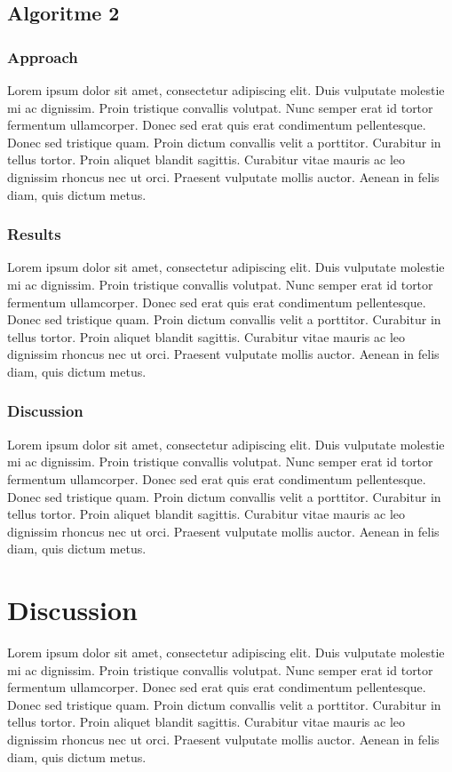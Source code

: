 \documentclass[11pt]{article}
\begin{document}
\subsection{Algoritme 2}
\subsubsection{Approach}
Lorem ipsum dolor sit amet, consectetur adipiscing elit. Duis vulputate molestie mi ac dignissim. Proin tristique convallis volutpat. Nunc semper erat id tortor fermentum ullamcorper. Donec sed erat quis erat condimentum pellentesque. Donec sed tristique quam. Proin dictum convallis velit a porttitor. Curabitur in tellus tortor. Proin aliquet blandit sagittis. Curabitur vitae mauris ac leo dignissim rhoncus nec ut orci. Praesent vulputate mollis auctor. Aenean in felis diam, quis dictum metus.

\subsubsection{Results}

Lorem ipsum dolor sit amet, consectetur adipiscing elit. Duis vulputate molestie mi ac dignissim. Proin tristique convallis volutpat. Nunc semper erat id tortor fermentum ullamcorper. Donec sed erat quis erat condimentum pellentesque. Donec sed tristique quam. Proin dictum convallis velit a porttitor. Curabitur in tellus tortor. Proin aliquet blandit sagittis. Curabitur vitae mauris ac leo dignissim rhoncus nec ut orci. Praesent vulputate mollis auctor. Aenean in felis diam, quis dictum metus.

\subsubsection{Discussion}
Lorem ipsum dolor sit amet, consectetur adipiscing elit. Duis vulputate molestie mi ac dignissim. Proin tristique convallis volutpat. Nunc semper erat id tortor fermentum ullamcorper. Donec sed erat quis erat condimentum pellentesque. Donec sed tristique quam. Proin dictum convallis velit a porttitor. Curabitur in tellus tortor. Proin aliquet blandit sagittis. Curabitur vitae mauris ac leo dignissim rhoncus nec ut orci. Praesent vulputate mollis auctor. Aenean in felis diam, quis dictum metus.



\section{Discussion}
Lorem ipsum dolor sit amet, consectetur adipiscing elit. Duis vulputate molestie mi ac dignissim. Proin tristique convallis volutpat. Nunc semper erat id tortor fermentum ullamcorper. Donec sed erat quis erat condimentum pellentesque. Donec sed tristique quam. Proin dictum convallis velit a porttitor. Curabitur in tellus tortor. Proin aliquet blandit sagittis. Curabitur vitae mauris ac leo dignissim rhoncus nec ut orci. Praesent vulputate mollis auctor. Aenean in felis diam, quis dictum metus.
\end{document}
